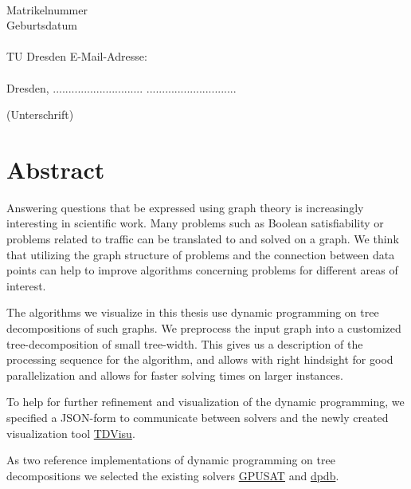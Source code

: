 \documentclass[a4paper, 12pt]{scrartcl}
\begin{document}
\noindent
\myauthor \\
Matrikelnummer \mymatriculation\\
Geburtsdatum \mybirthday\\\\
TU Dresden E-Mail-Adresse:\\
 \myemail\\[40pt]


Dresden,  ............................. \hfill .............................
\begin{flushright}
	(Unterschrift)\hspace{1em}
\end{flushright}


\newpage

\section*{Abstract}
\vspace{4ex}

Answering questions that  be expressed using graph theory is increasingly interesting in scientific work.
Many problems such as Boolean satisfiability or problems related to traffic can be translated to and solved on a graph.
We think that utilizing the graph structure of problems and the connection between data points can help to improve algorithms concerning problems for different areas of interest.

The algorithms we visualize in this thesis use dynamic programming on tree decompositions of such graphs.
We preprocess the input graph into a customized tree-decomposition of small tree-width.
This gives us a description of the processing sequence for the algorithm, and allows 
with right hindsight for good parallelization and allows for faster solving times on larger instances.

To help for further refinement and visualization of the dynamic programming,
we specified a JSON-form to communicate between solvers and the newly created visualization tool \href{https://github.com/VaeterchenFrost/tdvisu}{TDVisu}.

As two reference implementations of dynamic programming on tree decompositions we selected the existing solvers \href{https://github.com/daajoe/GPUSAT}{GPUSAT} and \href{https://github.com/hmarkus/dp_on_dbs}{dpdb}.
\end{document}
